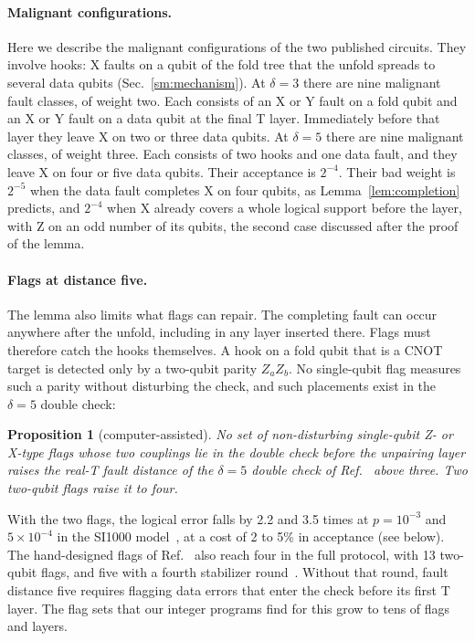 \documentclass[aps,prl,reprint,twocolumn,amsmath,amssymb,floatfix,nofootinbib,superscriptaddress]{revtex4-2}
\newtheorem{proposition}[theorem]{Proposition}
\theoremstyle{definition}
\theoremstyle{remark}
\begin{document}
\paragraph*{Malignant configurations.}
Here we describe the malignant configurations of the two published circuits. They involve hooks: X faults on a qubit of the fold tree that the unfold spreads to several data qubits (Sec.~\ref{sm:mechanism}). At $\delta=3$ there are nine malignant fault classes, of weight two. Each consists of an X or Y fault on a fold qubit and an X or Y fault on a data qubit at the final T layer. Immediately before that layer they leave X on two or three data qubits. At $\delta=5$ there are nine malignant classes, of weight three. Each consists of two hooks and one data fault, and they leave X on four or five data qubits. Their acceptance is $2^{-4}$. Their bad weight is $2^{-5}$ when the data fault completes X on four qubits, as Lemma~\ref{lem:completion} predicts, and $2^{-4}$ when X already covers a whole logical support before the layer, with Z on an odd number of its qubits, the second case discussed after the proof of the lemma.

\paragraph*{Flags at distance five.}
The lemma also limits what flags can repair. The completing fault can occur anywhere after the unfold, including in any layer inserted there. Flags must therefore catch the hooks themselves. A hook on a fold qubit that is a CNOT target is detected only by a two-qubit parity $Z_aZ_b$. No single-qubit flag measures such a parity without disturbing the check, and such placements exist in the $\delta=5$ double check:
\begin{proposition}[computer-assisted]\label{prop:flags}
No set of non-disturbing single-qubit Z- or X-type flags whose two couplings lie in the double check before the unpairing layer raises the real-T fault distance of the $\delta=5$ double check of Ref.~\cite{cultivation} above three. Two two-qubit flags raise it to four.
\end{proposition}
With the two flags, the logical error falls by 2.2 and 3.5 times at $p=10^{-3}$ and $5\times10^{-4}$ in the SI1000 model~\cite{si1000}, at a cost of 2 to 5\% in acceptance (see below). The hand-designed flags of Ref.~\cite{chan} also reach four in the full protocol, with 13 two-qubit flags, and five with a fourth stabilizer round~\cite{chan,wanzapirain}. Without that round, fault distance five requires flagging data errors that enter the check before its first T layer. The flag sets that our integer programs find for this grow to tens of flags and layers.
\end{document}
